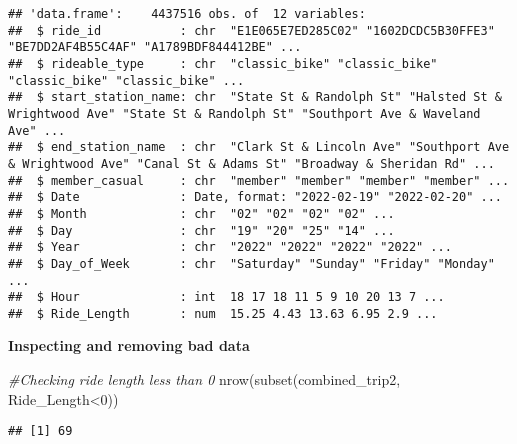 \documentclass[
]{article}
\newenvironment{Shaded}{\begin{snugshade}}{\end{snugshade}}
\newcommand{\CommentTok}[1]{\textcolor[rgb]{0.56,0.35,0.01}{\textit{#1}}}
\newcommand{\DecValTok}[1]{\textcolor[rgb]{0.00,0.00,0.81}{#1}}
\newcommand{\FunctionTok}[1]{\textcolor[rgb]{0.00,0.00,0.00}{#1}}
\newcommand{\NormalTok}[1]{#1}
\newcommand{\OtherTok}[1]{\textcolor[rgb]{0.56,0.35,0.01}{#1}}
\newcommand{\SpecialCharTok}[1]{\textcolor[rgb]{0.00,0.00,0.00}{#1}}
\newcommand{\StringTok}[1]{\textcolor[rgb]{0.31,0.60,0.02}{#1}}
\begin{document}
\begin{verbatim}
## 'data.frame':    4437516 obs. of  12 variables:
##  $ ride_id           : chr  "E1E065E7ED285C02" "1602DCDC5B30FFE3" "BE7DD2AF4B55C4AF" "A1789BDF844412BE" ...
##  $ rideable_type     : chr  "classic_bike" "classic_bike" "classic_bike" "classic_bike" ...
##  $ start_station_name: chr  "State St & Randolph St" "Halsted St & Wrightwood Ave" "State St & Randolph St" "Southport Ave & Waveland Ave" ...
##  $ end_station_name  : chr  "Clark St & Lincoln Ave" "Southport Ave & Wrightwood Ave" "Canal St & Adams St" "Broadway & Sheridan Rd" ...
##  $ member_casual     : chr  "member" "member" "member" "member" ...
##  $ Date              : Date, format: "2022-02-19" "2022-02-20" ...
##  $ Month             : chr  "02" "02" "02" "02" ...
##  $ Day               : chr  "19" "20" "25" "14" ...
##  $ Year              : chr  "2022" "2022" "2022" "2022" ...
##  $ Day_of_Week       : chr  "Saturday" "Sunday" "Friday" "Monday" ...
##  $ Hour              : int  18 17 18 11 5 9 10 20 13 7 ...
##  $ Ride_Length       : num  15.25 4.43 13.63 6.95 2.9 ...
\end{verbatim}

\textbf{Inspecting and removing bad data }

\begin{Shaded}
\begin{Highlighting}[]
\CommentTok{\#Checking ride length less than 0}
\FunctionTok{nrow}\NormalTok{(}\FunctionTok{subset}\NormalTok{(combined\_trip2, Ride\_Length}\SpecialCharTok{\textless{}}\DecValTok{0}\NormalTok{))}
\end{Highlighting}
\end{Shaded}

\begin{verbatim}
## [1] 69
\end{verbatim}

\begin{Shaded}
\end{Shaded}
\end{document}
